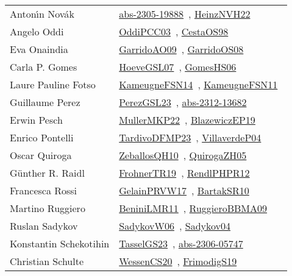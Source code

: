 {\begin{longtable}{p{4cm}p{20cm}}
Anton{\'{\i}}n Nov{\'{a}}k & \href{works/abs-2305-19888.pdf}{abs-2305-19888}~\cite{abs-2305-19888}, \href{works/HeinzNVH22.pdf}{HeinzNVH22}~\cite{HeinzNVH22}\\
Angelo Oddi & \href{works/OddiPCC03.pdf}{OddiPCC03}~\cite{OddiPCC03}, \href{works/CestaOS98.pdf}{CestaOS98}~\cite{CestaOS98}\\
Eva Onaindia & \href{works/GarridoAO09.pdf}{GarridoAO09}~\cite{GarridoAO09}, \href{works/GarridoOS08.pdf}{GarridoOS08}~\cite{GarridoOS08}\\
Carla P. Gomes & \href{works/HoeveGSL07.pdf}{HoeveGSL07}~\cite{HoeveGSL07}, \href{works/GomesHS06.pdf}{GomesHS06}~\cite{GomesHS06}\\
Laure Pauline Fotso & \href{works/KameugneFSN14.pdf}{KameugneFSN14}~\cite{KameugneFSN14}, \href{works/KameugneFSN11.pdf}{KameugneFSN11}~\cite{KameugneFSN11}\\
Guillaume Perez & \href{works/PerezGSL23.pdf}{PerezGSL23}~\cite{PerezGSL23}, \href{works/abs-2312-13682.pdf}{abs-2312-13682}~\cite{abs-2312-13682}\\
Erwin Pesch & \href{works/MullerMKP22.pdf}{MullerMKP22}~\cite{MullerMKP22}, \href{}{BlazewiczEP19}~\cite{BlazewiczEP19}\\
Enrico Pontelli & \href{works/TardivoDFMP23.pdf}{TardivoDFMP23}~\cite{TardivoDFMP23}, \href{}{VillaverdeP04}~\cite{VillaverdeP04}\\
Oscar Quiroga & \href{works/ZeballosQH10.pdf}{ZeballosQH10}~\cite{ZeballosQH10}, \href{works/QuirogaZH05.pdf}{QuirogaZH05}~\cite{QuirogaZH05}\\
G{\"{u}}nther R. Raidl & \href{works/FrohnerTR19.pdf}{FrohnerTR19}~\cite{FrohnerTR19}, \href{works/RendlPHPR12.pdf}{RendlPHPR12}~\cite{RendlPHPR12}\\
Francesca Rossi & \href{works/GelainPRVW17.pdf}{GelainPRVW17}~\cite{GelainPRVW17}, \href{works/BartakSR10.pdf}{BartakSR10}~\cite{BartakSR10}\\
Martino Ruggiero & \href{works/BeniniLMR11.pdf}{BeniniLMR11}~\cite{BeniniLMR11}, \href{works/RuggieroBBMA09.pdf}{RuggieroBBMA09}~\cite{RuggieroBBMA09}\\
Ruslan Sadykov & \href{works/SadykovW06.pdf}{SadykovW06}~\cite{SadykovW06}, \href{works/Sadykov04.pdf}{Sadykov04}~\cite{Sadykov04}\\
Konstantin Schekotihin & \href{works/TasselGS23.pdf}{TasselGS23}~\cite{TasselGS23}, \href{works/abs-2306-05747.pdf}{abs-2306-05747}~\cite{abs-2306-05747}\\
Christian Schulte & \href{works/WessenCS20.pdf}{WessenCS20}~\cite{WessenCS20}, \href{works/FrimodigS19.pdf}{FrimodigS19}~\cite{FrimodigS19}\\

\end{longtable}}
